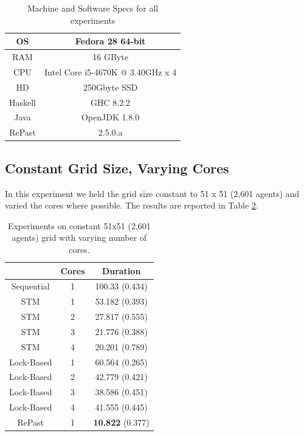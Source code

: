 \begin{table}
	\centering
	\begin{tabular}{ c || c }
		OS & Fedora 28 64-bit \\ \hline
		RAM & 16 GByte \\ \hline
		CPU & Intel Core i5-4670K @ 3.40GHz x 4 \\ \hline
		HD & 250Gbyte SSD \\ \hline
		Haskell & GHC 8.2.2 \\ \hline
		Java & OpenJDK 1.8.0 \\ \hline
		RePast & 2.5.0.a
	\end{tabular}
	
	\caption{Machine and Software Specs for all experiments}
	\label{tab:machine_specs}
\end{table}

\subsection{Constant Grid Size, Varying Cores}
In this experiment we held the grid size constant to 51 x 51 (2,601 agents) and varied the cores where possible. The results are reported in Table \ref{tab:constgrid_varyingcores}.

\begin{table}
	\centering
  	\begin{tabular}{ c || c | c  }
                    & Cores & Duration       \\ \hline \hline 
    	Sequential  & 1     & 100.33 (0.434) \\ \hline \hline
   		STM         & 1     & 53.182 (0.393) \\ \hline
   		STM         & 2     & 27.817 (0.555) \\ \hline
   		STM         & 3     & 21.776 (0.388) \\ \hline
   		STM         & 4     & 20.201 (0.789) \\ \hline \hline
   		Lock-Based  & 1     & 60.564 (0.265) \\ \hline 
   		Lock-Based  & 2     & 42.779 (0.421) \\ \hline 
   		Lock-Based  & 3     & 38.586 (0.451) \\ \hline 
   		Lock-Based  & 4     & 41.555 (0.445) \\ \hline \hline
   		RePast      & 1     & \textbf{10.822} (0.377)
  	\end{tabular}
  	
  	\caption{Experiments on constant 51x51 (2,601 agents) grid with varying number of cores.}
	\label{tab:constgrid_varyingcores}
\end{table}


